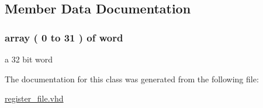 \subsection{\-Member \-Data \-Documentation}
\hypertarget{classregister__file_1_1behavioral_a312e330e12c981e3094d8419afb16a58}{
\subsubsection[{register\-File}]{ {\bfseries array (  0    to    31  )  of {\bfseries {\bf word}}  } }}\label{classregister__file_1_1behavioral_a312e330e12c981e3094d8419afb16a58}
a 32 bit word 

\-The documentation for this class was generated from the following file\-:\begin{DoxyCompactItemize}
\item 
\hyperlink{register__file_8vhd}{register\-\_\-file.\-vhd}\end{DoxyCompactItemize}
